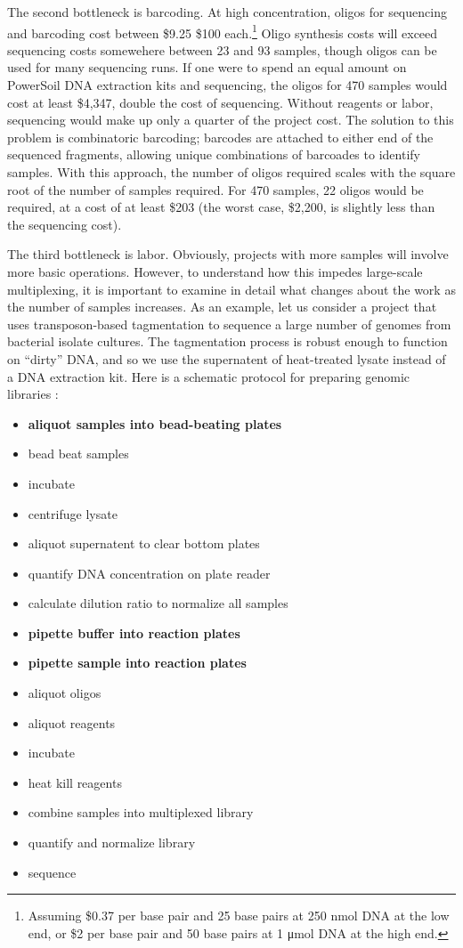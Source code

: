\begin{refsection}
The second bottleneck is barcoding. At high concentration, oligos for sequencing and barcoding cost between \$9.25 \$100 each.\footnote{Assuming \$0.37 per base pair and 25 base pairs at 250 \si{\nano\mole} DNA at the low end, or \$2 per base pair and 50 base pairs at 1 \si{\micro\mole} DNA at the high end.} Oligo synthesis costs will exceed sequencing costs somewehere between 23 and 93 samples, though oligos can be used for many sequencing runs. If one were to spend an equal amount on PowerSoil DNA extraction kits and sequencing, the oligos for 470 samples would cost at least \$4,347, double the cost of sequencing. Without reagents or labor, sequencing would make up only a quarter of the project cost. The solution to this problem is combinatoric barcoding; barcodes are attached to either end of the sequenced fragments, allowing unique combinations of barcoades to identify samples. With this approach, the number of oligos required scales with the square root of the number of samples required. For 470 samples, 22 oligos would be required, at a cost of at least \$203 (the worst case, \$2,200, is slightly less than the sequencing cost).

The third bottleneck is labor. Obviously, projects with more samples will involve more basic operations. However, to understand how this impedes large-scale multiplexing, it is important to examine in detail what changes about the work as the number of samples increases. As an example, let us consider a project that uses transposon-based tagmentation \cite{adey2010rapid} to sequence a large number of genomes from bacterial isolate cultures. The tagmentation process is robust enough to function on ``dirty'' DNA, and so we use the supernatent of heat-treated lysate instead of a DNA extraction kit. Here is a schematic protocol for preparing genomic libraries :

\begin{itemize}[noitemsep]
\item \textbf{aliquot samples into bead-beating plates}
\item bead beat samples
\item incubate
\item centrifuge lysate
\item aliquot supernatent to clear bottom plates
\item quantify DNA concentration on plate reader
\item calculate dilution ratio to normalize all samples
\item \textbf{pipette buffer into reaction plates}
\item \textbf{pipette sample into reaction plates}
\item aliquot oligos
\item aliquot reagents
\item incubate
\item heat kill reagents
\item combine samples into multiplexed library
\item quantify and normalize library
\item sequence
\end{itemize}


\end{refsection}
